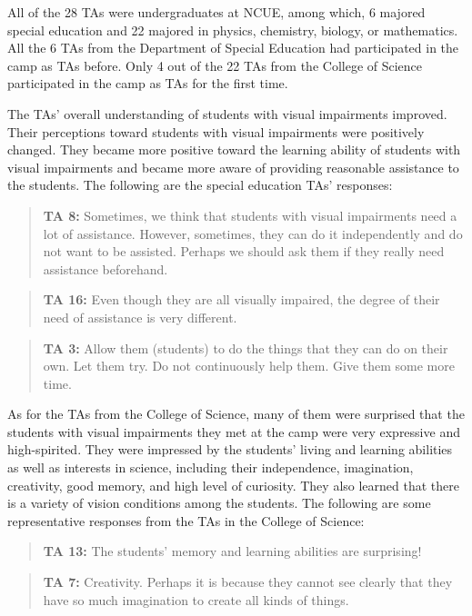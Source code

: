 \documentclass[11.5pt]{sig-alternate} %
\begin{document}
\begin{large}
All of the 28 TAs were undergraduates at NCUE, among which, 6 majored special education and 22 majored in physics, chemistry, biology, or mathematics. All the 6 TAs from the Department of Special Education had participated in the camp as TAs before. Only 4 out of the 22 TAs from the College of Science participated in the camp as TAs for the first time.

The TAs’ overall understanding of students with visual impairments improved. Their perceptions toward students with visual impairments were positively changed. They became more positive toward the learning ability of students with visual impairments and became more aware of providing reasonable assistance to the students. The following are the special education TAs’ responses:

\begin{quote}
\textbf{TA 8:} Sometimes, we think that students with visual impairments need a lot of assistance. However, sometimes, they can do it independently and do not want to be assisted. Perhaps we should ask them if they really need assistance beforehand.
\end{quote}

\begin{quote}
\textbf{TA 16:} Even though they are all visually impaired, the degree of their need of assistance is very different.
\end{quote}

\begin{quote}
\textbf{TA 3:} Allow them (students) to do the things that they can do on their own. Let them try. Do not continuously help them. Give them some more time.
\end{quote}

As for the TAs from the College of Science, many of them were surprised that the students with visual impairments they met at the camp were very expressive and high-spirited. They were impressed by the students’ living and learning abilities as well as interests in science, including their independence, imagination, creativity, good memory, and high level of curiosity. They also learned that there is a variety of vision conditions among the students. The following are some representative responses from the TAs in the College of Science:

\begin{quote}
\textbf{TA 13:} The students' memory and learning abilities are surprising!
\end{quote}

\begin{quote}
\textbf{TA 7:} Creativity. Perhaps it is because they cannot see clearly that they have so much imagination to create all kinds of things. 
\end{quote}


\end{large}
\end{document}
